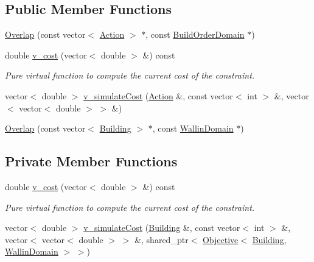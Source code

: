 \subsection*{Public Member Functions}
\begin{DoxyCompactItemize}
\item 
\hyperlink{classghost_1_1Overlap_ab0968eeda4433f417c1e38675d38fe75}{Overlap} (const vector$<$ \hyperlink{classghost_1_1Action}{Action} $>$ $\ast$, const \hyperlink{classghost_1_1BuildOrderDomain}{Build\-Order\-Domain} $\ast$)
\item 
double \hyperlink{classghost_1_1Overlap_a7a926991f06c785126e5d7995953e493}{v\-\_\-cost} (vector$<$ double $>$ \&) const 
\begin{DoxyCompactList}\small\item\em Pure virtual function to compute the current cost of the constraint. \end{DoxyCompactList}\item 
vector$<$ double $>$ \hyperlink{classghost_1_1Overlap_a2130361801f50c5a35594097982655b7}{v\-\_\-simulate\-Cost} (\hyperlink{classghost_1_1Action}{Action} \&, const vector$<$ int $>$ \&, vector$<$ vector$<$ double $>$ $>$ \&)
\item 
\hyperlink{classghost_1_1Overlap_a256dfd7655e1937ed0d13368527e9eec}{Overlap} (const vector$<$ \hyperlink{classghost_1_1Building}{Building} $>$ $\ast$, const \hyperlink{classghost_1_1WallinDomain}{Wallin\-Domain} $\ast$)
\end{DoxyCompactItemize}
\subsection*{Private Member Functions}
\begin{DoxyCompactItemize}
\item 
double \hyperlink{classghost_1_1Overlap_a7a926991f06c785126e5d7995953e493}{v\-\_\-cost} (vector$<$ double $>$ \&) const 
\begin{DoxyCompactList}\small\item\em Pure virtual function to compute the current cost of the constraint. \end{DoxyCompactList}\item 
vector$<$ double $>$ \hyperlink{classghost_1_1Overlap_a3a347d3067235b29bbb19c2013498edf}{v\-\_\-simulate\-Cost} (\hyperlink{classghost_1_1Building}{Building} \&, const vector$<$ int $>$ \&, vector$<$ vector$<$ double $>$ $>$ \&, shared\-\_\-ptr$<$ \hyperlink{classghost_1_1Objective}{Objective}$<$ \hyperlink{classghost_1_1Building}{Building}, \hyperlink{classghost_1_1WallinDomain}{Wallin\-Domain} $>$ $>$)
\end{DoxyCompactItemize}
